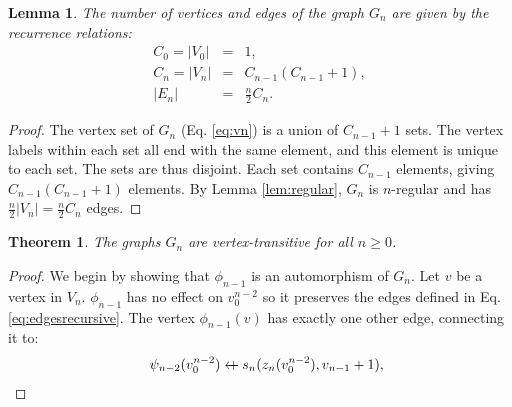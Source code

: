 \documentclass{article}
\newcommand{\beq}{\begin{eqnarray}}
\newcommand{\eeq}{\end{eqnarray}}
\newcommand{\append}{\leftarrow{\mkern-18mu}{+}\:}
\newtheorem{lemma}{Lemma}
\newtheorem{theorem}{Theorem}
\begin{document}
\begin{lemma}
The number of vertices and edges of the graph $G_n$ are given by the recurrence
relations:
\beq
C_0 = |V_0| &=& 1, \\
\label{eq:cnrec}C_{n} = |V_{n}| &=& C_{n-1} (C_{n-1} + 1), \\
|E_n| &=& \frac{n}{2} C_n.
\eeq
\end{lemma}
\begin{proof}
The vertex set of $G_n$ (Eq. \ref{eq:vn}) is a union of
$C_{n-1} + 1$ sets.
The vertex labels within each set all end with the same element,
and this element is unique to each set.
The sets are thus disjoint.
Each set contains $C_{n-1}$ elements, giving $C_{n-1}(C_{n-1} + 1)$
elements.
By Lemma \ref{lem:regular}, $G_n$ is $n$-regular and has
$\frac{n}{2}|V_n| = \frac{n}{2}C_n$ edges.
\end{proof}
\begin{theorem}
The graphs $G_n$ are vertex-transitive for all $n \geq 0$.
\end{theorem}
\begin{proof}
We begin by showing that $\phi_{n-1}$ is an automorphism of $G_n$.
Let $v$ be a vertex in $V_n$.
$\phi_{n-1}$ has no effect on $v_0^{n-2}$ so it preserves the edges defined
in Eq. \ref{eq:edgesrecursive}.
The vertex $\phi_{n-1}(v)$ has exactly one other edge, connecting it to:
\beq
&& \psi_{n-2}(v_0^{n-2}) \append s_n(z_n(v_0^{n-2}), v_{n-1} + 1), \\
\eeq
\end{proof}



\end{document}
